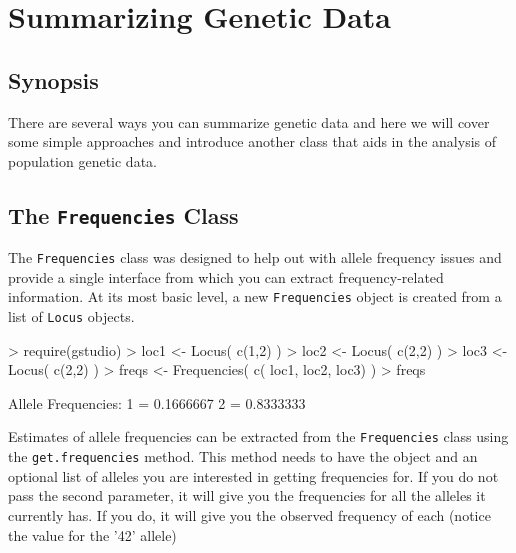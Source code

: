 \documentclass[letterpaper,twoside,openany]{book}
\begin{document}
\chapter{Summarizing Genetic Data}

\section{Synopsis}

There are several ways you can summarize genetic data and here we will cover some simple approaches and introduce another class that aids in the analysis of population genetic data.


\section{The \texttt{Frequencies} Class}

The \texttt{Frequencies} class was designed to help out with allele frequency issues and provide a single interface from which you can extract frequency-related information.  At its most basic level, a new \texttt{Frequencies} object is created from a list of \texttt{Locus}  objects.  

\begin{Schunk}
\begin{Sinput}
> require(gstudio)
> loc1 <- Locus( c(1,2) )
> loc2 <- Locus( c(2,2) )
> loc3 <- Locus( c(2,2) )
> freqs <- Frequencies( c( loc1, loc2, loc3) )
> freqs
\end{Sinput}
\begin{Soutput}
Allele Frequencies:
  1 = 0.1666667 
  2 = 0.8333333 
\end{Soutput}
\end{Schunk}

Estimates of allele frequencies can be extracted from the \texttt{Frequencies}  class using the \texttt{get.frequencies} method.  This method needs to have the object and an optional list of alleles you are interested in getting frequencies for.  If you do not pass the second parameter, it will give you the frequencies for all the alleles it currently has.  If you do, it will give you the observed frequency of each (notice the value for the '42' allele)
\end{document}
